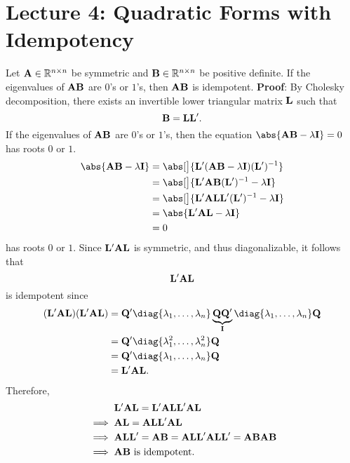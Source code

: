 \section{Lecture 4: Quadratic Forms with Idempotency}
\begin{Lemma}{}{}
      Let $ \mathbf{A}\in\mathbb{R}^{n\times n} $ be symmetric
      and $ \mathbf{B}\in\mathbb{R}^{n\times n} $ be positive
      definite. If the eigenvalues of $ \mathbf{AB} $
      are $ 0 $'s or $ 1 $'s, then $ \mathbf{AB} $ is idempotent.
      \tcblower{}
      \textbf{Proof}: By Cholesky decomposition, there exists an
      invertible lower triangular matrix $ \mathbf{L} $
      such that
      \[ \mathbf{B}=\mathbf{LL}'. \]
      If the eigenvalues of $ \mathbf{AB} $
      are $ 0 $'s or $ 1 $'s, then the equation
      $ \abs{\Matrix{AB}-\lambda \Matrix{I}}=0 $
      has roots $ 0 $ or $ 1 $.
      \begin{align*}
            \abs{\Matrix{AB}-\lambda \Matrix{I}}
             & =\abs[\big]{\Matrix{L}'(\Matrix{AB}-\lambda \Matrix{I})(\Matrix{L}')^{-1}} \\
             & =\abs[\big]{\Matrix{L}'\Matrix{AB}(\Matrix{L}')^{-1}-\lambda \Matrix{I}}   \\
             & =\abs[\big]{\Matrix{L}'\Matrix{ALL}'(\Matrix{L}')^{-1}-\lambda \Matrix{I}} \\
             & =\abs{\Matrix{L}'\Matrix{AL}-\lambda \Matrix{I}}                           \\
             & =0
      \end{align*}
      has roots $ 0 $ or $ 1 $. Since $ \mathbf{L}'\mathbf{AL} $ is symmetric, and
      thus diagonalizable, it follows that
      \[ \mathbf{L}'\mathbf{AL} \]
      is idempotent since
      \begin{align*}
            (\Matrix{L}'\Matrix{AL})(\Matrix{L}'\Matrix{AL})
             & =\Matrix{Q}'\diag{\lambda_1,\ldots,\lambda_n}\underbrace{\Matrix{Q}\Matrix{Q}'}_{\Matrix{I}}\diag{\lambda_1,\ldots,\lambda_n}\Matrix{Q} \\
             & =\Matrix{Q}'\diag{\lambda_1^2,\ldots,\lambda_n^2}\Matrix{Q}                                                                             \\
             & =\Matrix{Q}'\diag{\lambda_1,\ldots,\lambda_n}\Matrix{Q}                                                                                 \\
             & =\Matrix{L}'\Matrix{AL}.
      \end{align*}
      Therefore,
      \begin{align*}
             & \phantom{{}\implies{}}\Matrix{L}'\Matrix{AL}  =\Matrix{L}'\Matrix{ALL}'\Matrix{AL} \\
             & \implies \Matrix{AL}    =\Matrix{ALL}'\Matrix{AL}                                  \\
             & \implies \Matrix{ALL}'  =\Matrix{AB}=\Matrix{ALL}'\Matrix{ALL}'=\Matrix{ABAB}      \\
             & \implies \Matrix{AB}    \text{ is idempotent}.
      \end{align*}
\end{Lemma}
